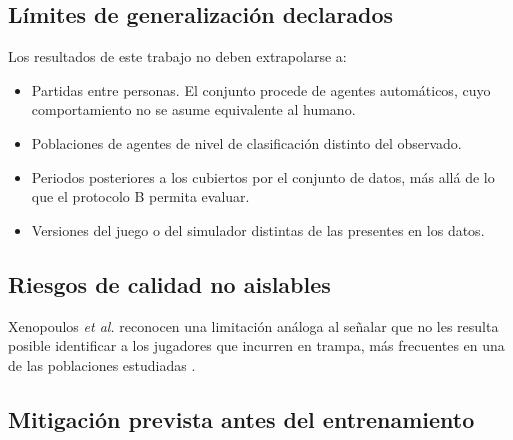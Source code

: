 \subsection{Límites de generalización declarados}
\label{subsec:limitesgeneralizacion}

Los resultados de este trabajo no deben extrapolarse a:

\begin{itemize}
  \item Partidas entre personas. El conjunto procede de agentes
        automáticos, cuyo comportamiento no se asume equivalente al humano.
  \item Poblaciones de agentes de nivel de clasificación distinto del
        observado.
  \item Periodos posteriores a los cubiertos por el conjunto de datos, más
        allá de lo que el protocolo B permita evaluar.
  \item Versiones del juego o del simulador distintas de las presentes en
        los datos.
\end{itemize}


\subsection{Riesgos de calidad no aislables}
\label{subsec:calidadnoaislable}


Xenopoulos \textit{et al.} reconocen una limitación análoga al señalar que
no les resulta posible identificar a los jugadores que incurren en trampa,
más frecuentes en una de las poblaciones estudiadas
\cite{xenopoulos_winprob_2022}.


\subsection{Mitigación prevista antes del entrenamiento}
\label{subsec:mitigacionetica}

